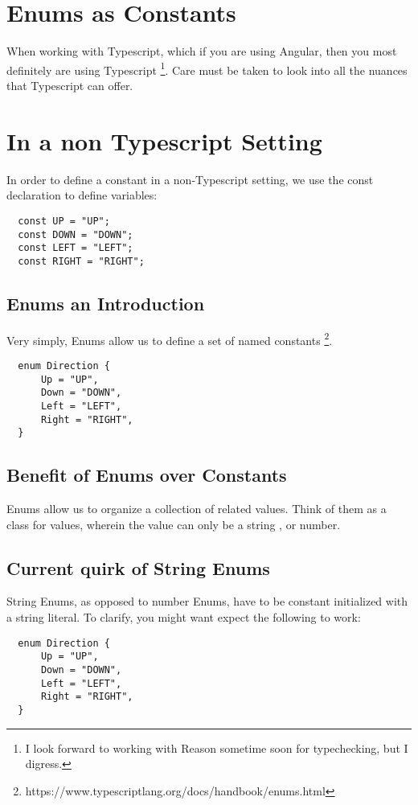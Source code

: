 \maketitle{}
\section{ Enums as Constants }

When working with Typescript, which if you are using Angular, then you most
definitely are using Typescript \footnote{I look forward to working with
Reason sometime soon for typechecking, but I digress.}. Care must be taken to
look into all the nuances that Typescript can offer.

\section{ In a non Typescript Setting }

In order to define a constant in a non-Typescript setting, we use the const
declaration to define variables:

\begin{lstlisting}
  const UP = "UP";
  const DOWN = "DOWN";
  const LEFT = "LEFT";
  const RIGHT = "RIGHT";
\end{lstlisting}

\subsection{ Enums an Introduction }
Very simply, Enums allow us to define a set of named constants
\footnote{https://www.typescriptlang.org/docs/handbook/enums.html}.

\begin{lstlisting}
  enum Direction {
      Up = "UP",
      Down = "DOWN",
      Left = "LEFT",
      Right = "RIGHT",
  }
\end{lstlisting}

\subsection{ Benefit of Enums over Constants }
Enums allow us to organize a collection of related values. Think of them as
a class for values, wherein the value can only be a string , or number.

\subsection{ Current quirk of String Enums }
String Enums, as opposed to number Enums, have to be constant initialized
with a string literal. To clarify, you might want expect the following to work:

\begin{lstlisting}
  enum Direction {
      Up = "UP",
      Down = "DOWN",
      Left = "LEFT",
      Right = "RIGHT",
  }
\end{lstlisting}
